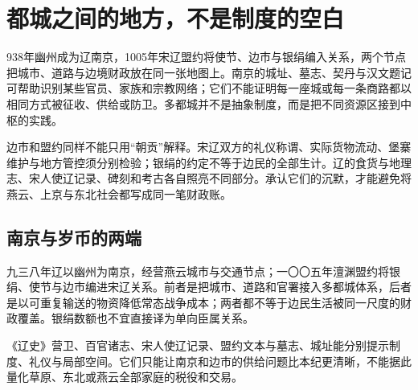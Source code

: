 \section{都城之间的地方，不是制度的空白}

938年幽州成为辽南京，1005年宋辽盟约将使节、边市与银绢编入关系，两个节点把城市、道路与边境财政放在同一张地图上。南京的城址、墓志、契丹与汉文题记可帮助识别某些官员、家族和宗教网络；它们不能证明每一座城或每一条商路都以相同方式被征收、供给或防卫。多都城并不是抽象制度，而是把不同资源区接到中枢的实践。

边市和盟约同样不能只用“朝贡”解释。宋辽双方的礼仪称谓、实际货物流动、堡寨维护与地方管控须分别检验；银绢的约定不等于边民的全部生计。辽的食货与地理志、宋人使辽记录、碑刻和考古各自照亮不同部分。承认它们的沉默，才能避免将燕云、上京与东北社会都写成同一笔财政账。

\subsection{南京与岁币的两端}

九三八年辽以幽州为南京，经营燕云城市与交通节点；一〇〇五年澶渊盟约将银绢、使节与边市编进宋辽关系。前者是把城市、道路和官署接入多都城体系，后者是以可重复输送的物资降低常态战争成本；两者都不等于边民生活被同一尺度的财政覆盖。银绢数额也不宜直接译为单向臣属关系。

《辽史》营卫、百官诸志、宋人使辽记录、盟约文本与墓志、城址能分别提示制度、礼仪与局部空间。它们只能让南京和边市的供给问题比本纪更清晰，不能据此量化草原、东北或燕云全部家庭的税役和交易。
